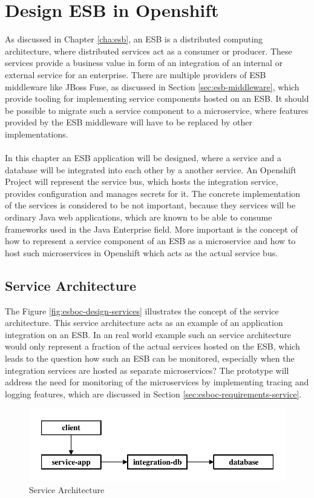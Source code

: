 \chapter{Design ESB in Openshift}
\label{cha:esboc}
As discussed in Chapter \vref{cha:esb}, an ESB is a distributed computing architecture, where distributed services act as a consumer or producer. These services provide a business value in form of an integration of an internal or external service for an enterprise. There are multiple providers of ESB middleware like JBoss Fuse, as discussed in Section \vref{sec:esb-middleware}, which provide tooling for implementing service components hosted on an ESB. It should be possible to migrate such a service component to a microservice, where features provided by the ESB middleware will have to be replaced by other implementations.
\\ \\
In this chapter an ESB application will be designed, where a service and a database will be integrated into each other by a another service. An Openshift Project will represent the service bus, which hosts the integration service, provides configuration and manages secrets for it. The concrete implementation of the services is considered to be not important, because they services will be ordinary Java web applications, which are known to be able to consume frameworks used in the Java Enterprise field. More important is the concept of how to represent a service component of an ESB as a microservice and how to host such microservices in Openshift which acts as the actual service bus.

\section{Service Architecture}
The Figure \vref{fig:esboc-design-services} illustrates the concept of the service architecture. This service architecture acts as an example of an application integration on an ESB. In an real world example such an service architecture would only represent a fraction of the actual services hosted on the ESB, which leads to the question how such an ESB can be monitored, especially when the integration services are hosted as separate microservices? The prototype will address the need for monitoring of the microservices by implementing tracing and logging features, which are discussed in Section \vref{sec:esboc-requirements-service}.

\begin{figure}[htbp]
	\centering
	\includegraphics[scale=1]{images/esboc-design-services.pdf}
	\caption{Service Architecture}
	\label{fig:esboc-design-services}
\end{figure}

